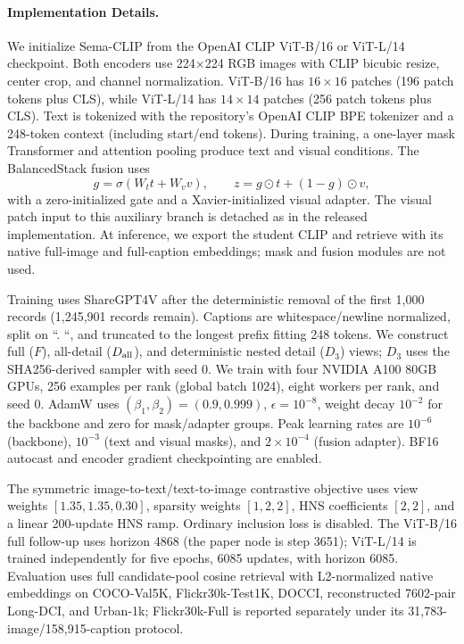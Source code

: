 \paragraph{Implementation Details.}
We initialize Sema-CLIP from the OpenAI CLIP ViT-B/16 or ViT-L/14 checkpoint. Both encoders use 224$\times$224 RGB images with CLIP bicubic resize, center crop, and channel normalization. ViT-B/16 has $16\times16$ patches (196 patch tokens plus CLS), while ViT-L/14 has $14\times14$ patches (256 patch tokens plus CLS). Text is tokenized with the repository's OpenAI CLIP BPE tokenizer and a 248-token context (including start/end tokens). During training, a one-layer mask Transformer and attention pooling produce text and visual conditions. The BalancedStack fusion uses
\[
g=\sigma(W_t t+W_v v),\qquad z=g\odot t+(1-g)\odot v,
\]
with a zero-initialized gate and a Xavier-initialized visual adapter. The visual patch input to this auxiliary branch is detached as in the released implementation. At inference, we export the student CLIP and retrieve with its native full-image and full-caption embeddings; mask and fusion modules are not used.

Training uses ShareGPT4V after the deterministic removal of the first 1,000 records (1,245,901 records remain). Captions are whitespace/newline normalized, split on ``. ``, and truncated to the longest prefix fitting 248 tokens. We construct full ($F$), all-detail ($D_{\rm all}$), and deterministic nested detail ($D_3$) views; $D_3$ uses the SHA256-derived sampler with seed 0. We train with four NVIDIA A100 80GB GPUs, 256 examples per rank (global batch 1024), eight workers per rank, and seed 0. AdamW uses $(\beta_1,\beta_2)=(0.9,0.999)$, $\epsilon=10^{-8}$, weight decay $10^{-2}$ for the backbone and zero for mask/adapter groups. Peak learning rates are $10^{-6}$ (backbone), $10^{-3}$ (text and visual masks), and $2\times10^{-4}$ (fusion adapter). BF16 autocast and encoder gradient checkpointing are enabled.

The symmetric image-to-text/text-to-image contrastive objective uses view weights $[1.35,1.35,0.30]$, sparsity weights $[1,2,2]$, HNS coefficients $[2,2]$, and a linear 200-update HNS ramp. Ordinary inclusion loss is disabled. The ViT-B/16 full follow-up uses horizon 4868 (the paper node is step 3651); ViT-L/14 is trained independently for five epochs, 6085 updates, with horizon 6085. Evaluation uses full candidate-pool cosine retrieval with L2-normalized native embeddings on COCO-Val5K, Flickr30k-Test1K, DOCCI, reconstructed 7602-pair Long-DCI, and Urban-1k; Flickr30k-Full is reported separately under its 31,783-image/158,915-caption protocol.
